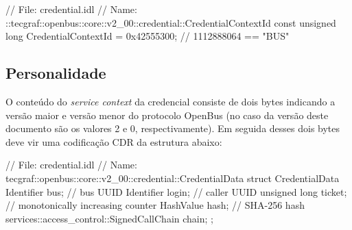 \documentclass[]{article}
\newcommand{\term}[1]{\textit{#1}}
\begin{document}
\begin{samplecode}[language={[CORBA]idl}]
// File: credential.idl
// Name: ::tecgraf::openbus::core::v2_00::credential::CredentialContextId
const unsigned long CredentialContextId = 0x42555300; // 1112888064 == "BUS\0"
\end{samplecode}

\subsection{Personalidade} %
\label{sub:personalidade}

O conteúdo do \term{service context} da credencial consiste de dois bytes indicando a versão maior e versão menor do protocolo OpenBus (no caso da versão deste documento são os valores 2 e 0, respectivamente).
Em seguida desses dois bytes deve vir uma codificação CDR da estrutura abaixo:

\begin{samplecode}[language={[CORBA]idl}]
// File: credential.idl
// Name: tecgraf::openbus::core::v2_00::credential::CredentialData
struct CredentialData {
	Identifier bus;       // bus UUID
	Identifier login;     // caller UUID
	unsigned long ticket; // monotonically increasing counter
	HashValue hash;       // SHA-256 hash
	services::access_control::SignedCallChain chain;
};
\end{samplecode}
\end{document}
